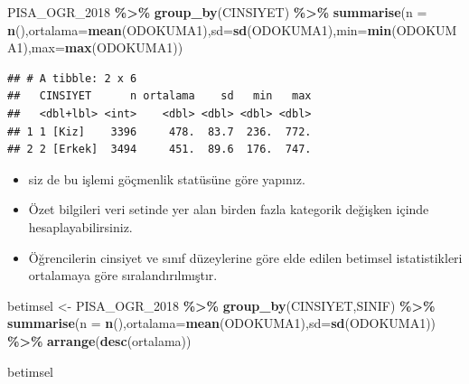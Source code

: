 \documentclass[
  oneside]{book}
\newenvironment{Shaded}{\begin{snugshade}}{\end{snugshade}}
\newcommand{\AttributeTok}[1]{\textcolor[rgb]{0.13,0.29,0.53}{#1}}
\newcommand{\FunctionTok}[1]{\textcolor[rgb]{0.13,0.29,0.53}{\textbf{#1}}}
\newcommand{\NormalTok}[1]{#1}
\newcommand{\OtherTok}[1]{\textcolor[rgb]{0.56,0.35,0.01}{#1}}
\newcommand{\SpecialCharTok}[1]{\textcolor[rgb]{0.81,0.36,0.00}{\textbf{#1}}}
\begin{document}
\begin{Shaded}
\begin{Highlighting}[]
\NormalTok{PISA\_OGR\_2018 }\SpecialCharTok{\%\textgreater{}\%}
  \FunctionTok{group\_by}\NormalTok{(CINSIYET) }\SpecialCharTok{\%\textgreater{}\%}
  \FunctionTok{summarise}\NormalTok{(}\AttributeTok{n =} \FunctionTok{n}\NormalTok{(),}\AttributeTok{ortalama=}\FunctionTok{mean}\NormalTok{(ODOKUMA1),}\AttributeTok{sd=}\FunctionTok{sd}\NormalTok{(ODOKUMA1),}\AttributeTok{min=}\FunctionTok{min}\NormalTok{(ODOKUMA1),}\AttributeTok{max=}\FunctionTok{max}\NormalTok{(ODOKUMA1))}
\end{Highlighting}
\end{Shaded}

\begin{verbatim}
## # A tibble: 2 x 6
##   CINSIYET      n ortalama    sd   min   max
##   <dbl+lbl> <int>    <dbl> <dbl> <dbl> <dbl>
## 1 1 [Kiz]    3396     478.  83.7  236.  772.
## 2 2 [Erkek]  3494     451.  89.6  176.  747.
\end{verbatim}

\begin{itemize}
\item
  siz de bu işlemi göçmenlik statüsüne göre yapınız.
\item
  Özet bilgileri veri setinde yer alan birden fazla kategorik değişken içinde hesaplayabilirsiniz.
\item
  Öğrencilerin cinsiyet ve sınıf düzeylerine göre elde edilen betimsel istatistikleri ortalamaya göre sıralandırılmıştır.
\end{itemize}

\begin{Shaded}
\begin{Highlighting}[]
\NormalTok{betimsel  }\OtherTok{\textless{}{-}}\NormalTok{ PISA\_OGR\_2018 }\SpecialCharTok{\%\textgreater{}\%}
  \FunctionTok{group\_by}\NormalTok{(CINSIYET,SINIF) }\SpecialCharTok{\%\textgreater{}\%}
  \FunctionTok{summarise}\NormalTok{(}\AttributeTok{n =} \FunctionTok{n}\NormalTok{(),}\AttributeTok{ortalama=}\FunctionTok{mean}\NormalTok{(ODOKUMA1),}\AttributeTok{sd=}\FunctionTok{sd}\NormalTok{(ODOKUMA1)) }\SpecialCharTok{\%\textgreater{}\%}  
  \FunctionTok{arrange}\NormalTok{(}\FunctionTok{desc}\NormalTok{(ortalama)) }

\NormalTok{betimsel}
\end{Highlighting}
\end{Shaded}
\end{document}

